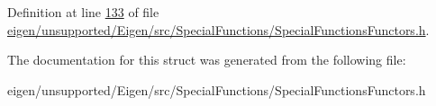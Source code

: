 Definition at line \hyperlink{eigen_2unsupported_2_eigen_2src_2_special_functions_2_special_functions_functors_8h_source_l00133}{133} of file \hyperlink{eigen_2unsupported_2_eigen_2src_2_special_functions_2_special_functions_functors_8h_source}{eigen/unsupported/\+Eigen/src/\+Special\+Functions/\+Special\+Functions\+Functors.\+h}.



The documentation for this struct was generated from the following file\+:\begin{DoxyCompactItemize}
\item 
eigen/unsupported/\+Eigen/src/\+Special\+Functions/\+Special\+Functions\+Functors.\+h\end{DoxyCompactItemize}
